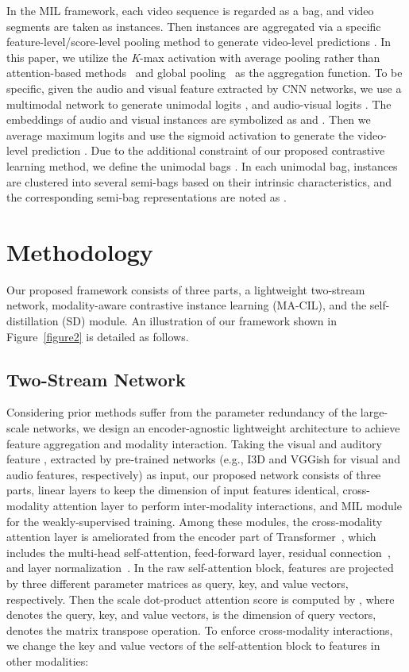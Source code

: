 \documentclass[sigconf]{acmart}
\begin{document}
In the MIL framework, each video sequence  is regarded as a bag, and video segments  are taken as instances. Then instances are aggregated via a specific feature-level/score-level pooling method to generate video-level predictions . In this paper, we utilize the \textit{K}-max activation with average pooling rather than attention-based methods~\cite{nguyen2018weakly, tian2020unified} and global pooling~\cite{zhang2019temporal, sultani2018real} as the aggregation function. To be specific, given the audio and visual feature  extracted by CNN networks, we use a multimodal network to generate unimodal logits , and audio-visual logits . The embeddings of audio and visual instances are symbolized as  and . Then we average  maximum logits and use the sigmoid activation to generate the video-level prediction . Due to the additional constraint of our proposed contrastive learning method, we define the unimodal bags . In each unimodal bag, instances are clustered into several semi-bags  based on their intrinsic characteristics, and the corresponding semi-bag representations are noted as .

\section{Methodology}

Our proposed framework consists of three parts, a lightweight two-stream network, modality-aware contrastive instance learning (MA-CIL), and the self-distillation (SD) module. An illustration of our framework shown in Figure~\ref{figure2} is detailed as follows. 

\subsection{Two-Stream Network}

Considering prior methods suffer from the parameter redundancy of the large-scale networks, we design an encoder-agnostic lightweight architecture to achieve feature aggregation and modality interaction. Taking the visual and auditory feature ,  extracted by pre-trained networks (e.g., I3D and VGGish for visual and audio features, respectively) as input, our proposed network consists of three parts, linear layers to keep the dimension of input features identical, cross-modality attention layer to perform inter-modality interactions, and MIL module for the weakly-supervised training. Among these modules, the cross-modality attention layer is ameliorated from the encoder part of Transformer~\cite{vaswani2017attention}, which includes the multi-head self-attention, feed-forward layer, residual connection~\cite{he2016deep}, and layer normalization~\cite{ba2016layer}. In the raw self-attention block, features are projected by three different parameter matrices as query, key, and value vectors, respectively. Then the scale dot-product attention score is computed by , where  denotes the query, key, and value vectors,  is the dimension of query vectors,  denotes the matrix transpose operation. To enforce cross-modality interactions, we change the key and value vectors of the self-attention block to features in other modalities:
\end{document}
